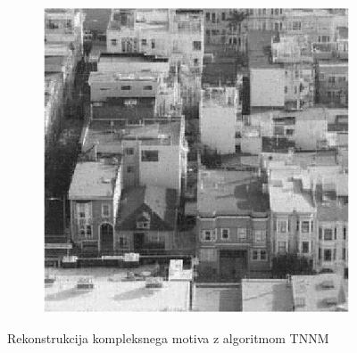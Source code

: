 \begin{figure}
\begin{subfigure}{0.325\linewidth}
    \end{subfigure}
    \hfill
    \begin{subfigure}{0.325\linewidth}
        \includegraphics[width=\linewidth]{Poglavja/Slike/kompleksnost/kompleksna grayscale 300/rez60TNNM.png}
    \end{subfigure}
    \caption{Rekonstrukcija kompleksnega motiva z algoritmom TNNM}
\end{figure}

